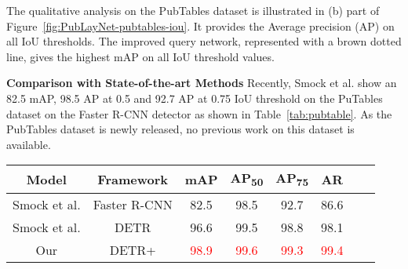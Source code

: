 \documentclass[sn-mathphys]{sn-jnl}\jyear{2021}\theoremstyle{thmstyleone}\newtheorem{theorem}{Theorem}\newtheorem{proposition}[theorem]{Proposition}\theoremstyle{thmstyletwo}\newtheorem{example}{Example}\newtheorem{remark}{Remark}\theoremstyle{thmstylethree}\newtheorem{definition}{Definition}\usepackage{amsmath}
\begin{document}
The qualitative analysis on the PubTables dataset is illustrated in (b) part of Figure~\ref{fig:PubLayNet-pubtables-iou}. It provides the Average precision (AP) on all IoU thresholds. The improved query network, represented with a brown dotted line, gives the highest mAP on all IoU threshold values. 

\noindent\textbf{Comparison with State-of-the-art Methods}
Recently, Smock et al.\cite {pubtables5} show an 82.5 mAP, 98.5 AP at 0.5 and 92.7 AP at 0.75 IoU threshold on the PuTables dataset on the Faster R-CNN detector as shown in Table~\ref{tab:pubtable}. As the PubTables dataset is newly released, no previous work on this dataset is available. 


\begin{table*}
\tiny
\begin{center}
\caption{Comparison between the transformer-based detectors and previous state-of-the-art results on PubTables dataset \colorbox{red!25}{without pre-processing} (raw data). Here, term  represents object queries as anchor boxes,  denotes object queries with positive noise and  indicates object queries with negative noise. The best results are exhibited.}\label{tab:pubtable}\begin{tabular*}{\textwidth}
{@{\extracolsep{\fill}}cccccccc@{\extracolsep{\fill}}}
\toprule
\textbf{Model} &
\textbf{Framework} &
\textbf{mAP} &
\textbf{AP\textsubscript{50}} &
\textbf{AP\textsubscript{75}} &
\textbf{AR}\\
\midrule

Smock et al.\cite {pubtables5} & Faster R-CNN & 82.5 & 98.5 & 92.7 & 86.6 \\

\midrule
Smock et al.\cite {pubtables5} & DETR & 96.6 & 99.5 & 98.8 & 98.1 \\ 
\midrule 
Our & DETR+  & \textcolor{red}{98.9} & \textcolor{red}{99.6} & \textcolor{red}{99.3} & \textcolor{red}{99.4}\\

\bottomrule
\end{tabular*}
\end{center}
\end{table*}
\end{document}
